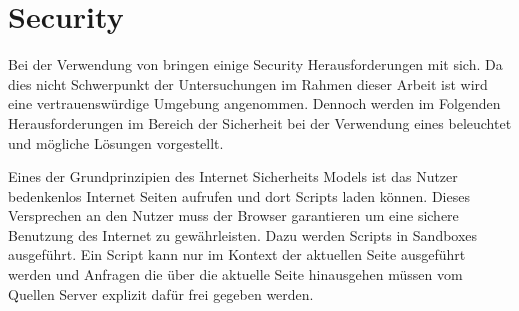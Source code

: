 
\section{Security}
Bei der Verwendung von \pTp \cdns bringen einige Security Herausforderungen mit sich. Da dies nicht Schwerpunkt der Untersuchungen im Rahmen dieser Arbeit ist wird eine vertrauenswürdige Umgebung angenommen. Dennoch werden im Folgenden Herausforderungen im Bereich der Sicherheit bei der Verwendung eines \pTp \cdns beleuchtet und mögliche Lösungen vorgestellt.

Eines der Grundprinzipien des Internet Sicherheits Models ist das Nutzer bedenkenlos Internet Seiten aufrufen und dort Scripts laden können.\cite{huang_chen} Dieses Versprechen an den Nutzer muss der Browser garantieren um eine sichere Benutzung des Internet zu gewährleisten. Dazu werden Scripts in Sandboxes ausgeführt.\cite{chrome_sandbox} Ein Script kann nur im Kontext der aktuellen Seite ausgeführt werden und Anfragen die über die aktuelle Seite hinausgehen müssen vom Quellen Server explizit dafür frei gegeben werden.\cite{cors_std} 

